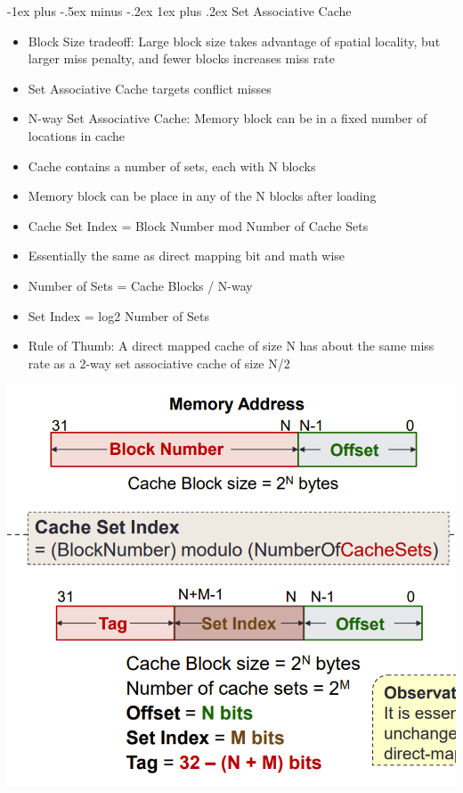 \documentclass[10pt, portrait]{article}
\makeatletter
\renewcommand{\subsection}{\@startsection{subsection}{3}{0mm}%
                                {-1ex plus -.5ex minus -.2ex}%
                                {1ex plus .2ex}%
                                {\normalfont\small\bfseries}}%
\makeatother
\begin{document}
\begin{multicols*}{2}
\subsection{Set Associative Cache}
\begin{itemize}
    \item Block Size tradeoff: Large block size takes advantage of spatial locality, but larger miss penalty, and fewer blocks increases miss rate
    \item Set Associative Cache targets conflict misses
    \item N-way Set Associative Cache: Memory block can be in a fixed number of locations in cache
    \item Cache contains a number of sets, each with N blocks
    \item Memory block can be place in any of the N blocks after loading
    \item Cache Set Index = Block Number mod Number of Cache Sets
    \item Essentially the same as direct mapping bit and math wise
    \item Number of Sets = Cache Blocks / N-way
    \item Set Index = log2 Number of Sets
    \item Rule of Thumb: A direct mapped cache of size N has about the same miss rate as a 2-way set associative cache of size N/2
\end{itemize}
\begin{center}
    \includegraphics[width=0.8\linewidth]{setcache.png}
\end{center}


\end{multicols*}
\end{document}
